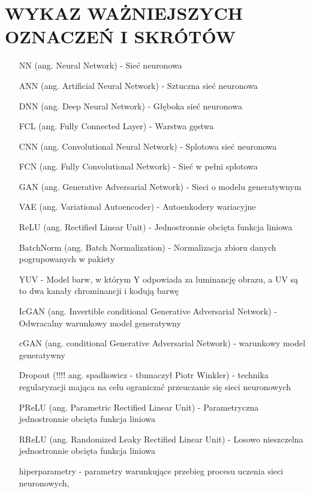 \section*{WYKAZ WAŻNIEJSZYCH OZNACZEŃ I SKRÓTÓW}

  \bigskip

  \begin{itemize}
    \item[NN] (ang. Neural Network) - Sieć neuronowa
    \item[ANN] (ang. Artificial Neural Network) - Sztuczna sieć neuronowa
    \item[DNN] (ang. Deep Neural Network) - Głęboka sieć neuronowa
    \item[FCL] (ang. Fully Connected Layer) - Warstwa gęstwa
    \item[CNN] (ang. Convolutional Neural Network) - Splotowa sieć neuronowa
    \item[FCN] (ang. Fully Convolutional Network) - Sieć w pełni splotowa
    \item[GAN] (ang. Generative Adversarial Network) - Sieci o modelu generatywnym
    \item[VAE] (ang. Variational Autoencoder) - Autoenkodery wariacyjne
    \item[ReLU] (ang. Rectified Linear Unit) - Jednostronnie obcięta funkcja liniowa
    \item[BatchNorm] (ang. Batch Normalization) - Normalizacja zbioru danych
    pogrupowanych w pakiety
    \item[YUV] - Model barw, w którym Y odpowiada za luminancję obrazu, a UV
    są to dwa kanały chrominancji i kodują barwę
    \item[IcGAN] (ang. Invertible conditional Generative Adversarial Network) -
    Odwracalny warunkowy model generatywny
    \item[cGAN] (ang. conditional Generative Adversarial Network) - warunkowy
    model generatywny
    \item[Dropout] (!!!! ang. spadkowicz - tłumaczył Piotr Winkler) - technika
    regularyzacji mająca na celu ograniczać przeuczanie się sieci neuronowych
    \item[PReLU] (ang. Parametric Rectified Linear Unit) - Parametryczna
    jednostronnie obcięta funkcja liniowa
    \item[RReLU] (ang. Randomized Leaky Rectified Linear Unit) - Losowo nieszczelna
    jednostronnie obcięta funkcja liniowa
    \item[hiperparametry] - parametry warunkujące przebieg procesu uczenia sieci neuronowych,

\end{itemize}
